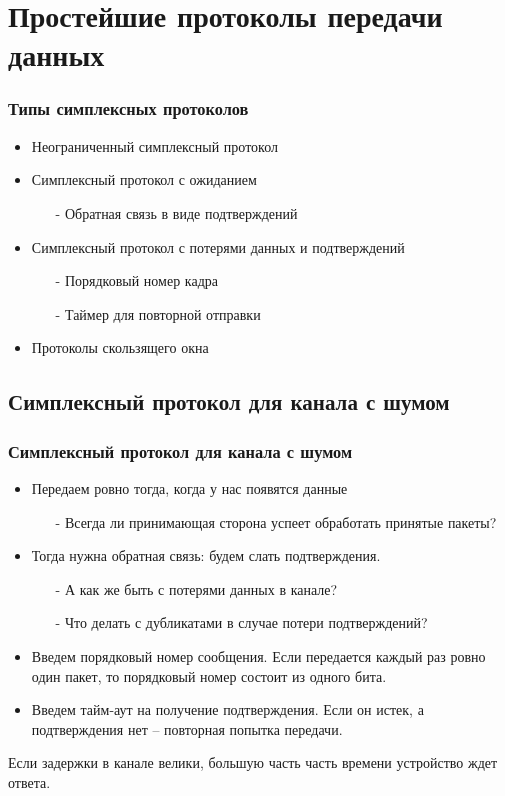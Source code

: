 \documentclass[utf8]{beamer}
\begin{document}
\section{Простейшие протоколы передачи данных}
\begin{frame}
\frametitle{Типы симплексных протоколов}
\begin{itemize}
  \item Неограниченный симплексный протокол
  \item Симплексный протокол с ожиданием
  \begin{itemize}
    \item[-] Обратная связь в виде подтверждений
  \end{itemize}
  \item Симплексный протокол с потерями данных и подтверждений
  \begin{itemize}
    \item[-] Порядковый номер кадра
    \item[-] Таймер для повторной отправки
  \end{itemize}
  \item Протоколы скользящего окна
\end{itemize}
\end{frame}
\subsection{Симплексный протокол для канала с шумом}
\begin{frame}
\frametitle{Симплексный протокол для канала с шумом}
\begin{itemize}
  \item Передаем ровно тогда, когда у нас появятся данные
    \begin{itemize}
    \item[-] Всегда ли принимающая сторона успеет обработать принятые пакеты?
  \end{itemize}
  \item Тогда нужна обратная связь: будем слать подтверждения.
  \begin{itemize}
    \item[-] А как же быть с потерями данных в канале?
    \item[-] Что делать с дубликатами в случае потери подтверждений?
  \end{itemize}
  \item Введем порядковый номер сообщения. Если передается каждый раз ровно один пакет, то порядковый номер состоит из одного бита.
  \item Введем тайм-аут на получение подтверждения. Если он истек, а подтверждения нет -- повторная попытка передачи.
\end{itemize}
Если задержки в канале велики, б{о}льшую часть часть времени устройство ждет ответа.
\end{frame}
\end{document}
